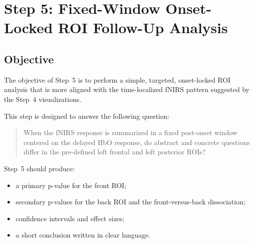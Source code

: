 \documentclass[11pt]{article}
\begin{document}
\sloppy
\section{Step 5: Fixed-Window Onset-Locked ROI Follow-Up Analysis}
\label{sec:step5_fixed_window}

\subsection{Objective}
The objective of Step~5 is to perform a simple, targeted, onset-locked ROI analysis that is more
aligned with the time-localized fNIRS pattern suggested by the Step~4 visualizations.

This step is designed to answer the following question:
\begin{quote}
When the fNIRS response is summarized in a fixed post-onset window centered on the delayed HbO
response, do abstract and concrete questions differ in the pre-defined left frontal and left posterior
ROIs?
\end{quote}

Step~5 should produce:
\begin{itemize}
    \item a primary p-value for the front ROI;
    \item secondary p-values for the back ROI and the front-versus-back dissociation;
    \item confidence intervals and effect sizes;
    \item a short conclusion written in clear language.
\end{itemize}
\end{document}
